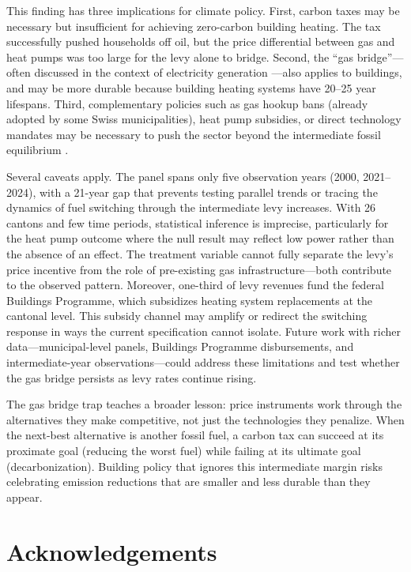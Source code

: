 \documentclass[12pt]{article}
\begin{document}
This finding has three implications for climate policy. First, carbon taxes may be necessary but insufficient for achieving zero-carbon building heating. The tax successfully pushed households off oil, but the price differential between gas and heat pumps was too large for the levy alone to bridge. Second, the ``gas bridge''---often discussed in the context of electricity generation \citep{grubb2014}---also applies to buildings, and may be more durable because building heating systems have 20--25 year lifespans. Third, complementary policies such as gas hookup bans (already adopted by some Swiss municipalities), heat pump subsidies, or direct technology mandates may be necessary to push the sector beyond the intermediate fossil equilibrium \citep{jaffe2005}.

Several caveats apply. The panel spans only five observation years (2000, 2021--2024), with a 21-year gap that prevents testing parallel trends or tracing the dynamics of fuel switching through the intermediate levy increases. With 26 cantons and few time periods, statistical inference is imprecise, particularly for the heat pump outcome where the null result may reflect low power rather than the absence of an effect. The treatment variable cannot fully separate the levy's price incentive from the role of pre-existing gas infrastructure---both contribute to the observed pattern. Moreover, one-third of levy revenues fund the federal Buildings Programme, which subsidizes heating system replacements at the cantonal level. This subsidy channel may amplify or redirect the switching response in ways the current specification cannot isolate. Future work with richer data---municipal-level panels, Buildings Programme disbursements, and intermediate-year observations---could address these limitations and test whether the gas bridge persists as levy rates continue rising.

The gas bridge trap teaches a broader lesson: price instruments work through the alternatives they make competitive, not just the technologies they penalize. When the next-best alternative is another fossil fuel, a carbon tax can succeed at its proximate goal (reducing the worst fuel) while failing at its ultimate goal (decarbonization). Building policy that ignores this intermediate margin risks celebrating emission reductions that are smaller and less durable than they appear.

\section*{Acknowledgements}
\end{document}

